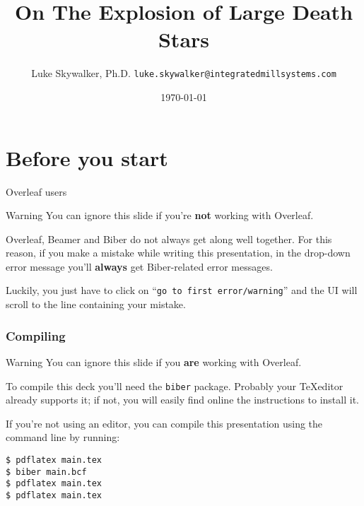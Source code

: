 \documentclass[usenames,dvipsnames,10pt,aspectratio=169]{beamer}
\title[Integrated Mill Systems Beamer Theme]{On The Explosion of Large Death Stars}
\date[\today]{\small\today}
\author[Luke Skywalker]{
  Luke Skywalker, Ph.D.
  \pdfnewline
  \texttt{luke.skywalker@integratedmillsystems.com}
}
\institute{IMS Innovation Group}
\begin{document}
\begin{frame}
\titlepage
\end{frame}

\begin{frame}{\contentsname}
\tableofcontents
\end{frame}

\section{Before you start}
\begin{frame}{Overleaf users}

\begin{alertblock}{Warning}
You can ignore this slide if you're \textbf{not} working with Overleaf.
\end{alertblock}

\vskip 0.5cm

Overleaf, Beamer and Biber do not always get along well together. For this reason, if you make a mistake while writing this presentation, in the drop-down error message you'll \textbf{always} get Biber-related error messages.

\vskip 0.5cm

Luckily, you just have to click on ``\texttt{go to first error/warning}'' and the UI will scroll to the line containing your mistake.

\end{frame}

\begin{frame}[fragile]
\frametitle{Compiling}

\begin{alertblock}{Warning}
You can ignore this slide if you \textbf{are} working with Overleaf.
\end{alertblock}

To compile this deck you'll need the \texttt{biber} package. Probably your \TeX editor already supports it; if not, you will easily find online the instructions to install it.

\vskip 0.5cm

If you're not using an editor, you can compile this presentation using the command line by running:

\begin{verbatim}
$ pdflatex main.tex
$ biber main.bcf
$ pdflatex main.tex
$ pdflatex main.tex
\end{verbatim}


\end{frame}
\end{document}
